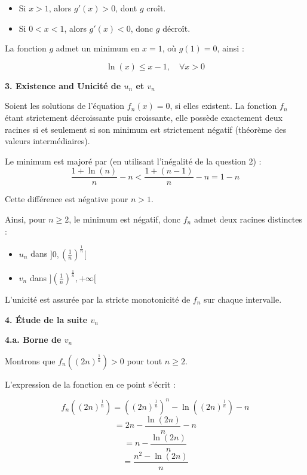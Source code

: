 \documentclass[10pt,a4paper]{article}
\begin{document}
\begin{itemize}
    \item Si \( x > 1 \), alors \( g'(x) > 0 \), dont \( g \) croît.
    \item Si \( 0 < x < 1 \), alors \( g'(x) < 0 \), donc \( g \) décroît.
\end{itemize}

La fonction \( g \) admet un minimum en \( x = 1 \), où \( g(1) = 0 \), ainsi :

\[
    \ln(x) \leq x - 1, \quad \forall x > 0
\]

\bigskip
\textbf{3. Existence and Unicité de \( u_n \) et \( v_n \)}

Soient les solutions de l'équation \( f_n(x) = 0 \), si elles existent. La fonction \( f_n \) étant
strictement décroissante puis croissante, elle possède exactement deux racines si et seulement si
son minimum est strictement négatif (théorème des valeurs intermédiaires).

Le minimum est majoré par (en utilisant l'inégalité de la question 2) :
\[
    \frac{1+\ln(n)}{n} - n < \frac{1 + (n-1)}{n}  - n = 1 - n
\]

Cette différence est négative pour \( n > 1 \).

Ainsi, pour \( n \geq 2 \), le minimum est négatif, donc \( f_n \) admet deux racines distinctes :
\begin{itemize}
    \item \( u_n \) dans \( ]0, \left(\frac{1}{n}\right)^{\frac{1}{n}}[ \)
    \item \( v_n \) dans \( ]\left(\frac{1}{n}\right)^{\frac{1}{n}}, +\infty[ \) \\
\end{itemize}

L'unicité est assurée par la stricte monotonicité de \( f_n \) sur chaque intervalle.

\bigskip
\textbf{4. Étude de la suite \( v_n \)}

\textbf{4.a. Borne de \( v_n \)}

Montrons que \( f_n \left((2n)^{\frac{1}{n}}\right) > 0 \) pour tout \( n \geq 2 \).

L'expression de la fonction en ce point s'écrit :

\[
    f_n \left((2n)^{\frac{1}{n}}\right) = \left((2n)^{\frac{1}{n}}\right)^n - \ln \left((2n)^{\frac{1}{n}}\right) - n
\]
\[
    = 2n - \frac{\ln(2n)}{n} - n
\]
\[
    = n - \frac{\ln(2n)}{n}
\]
\[
    = \frac{n^2 - \ln(2n)}{n}
\]
\end{document}

